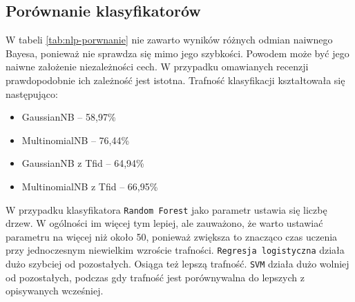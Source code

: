 \documentclass{article}
\begin{document}
\subsection{Porównanie klasyfikatorów}

\begin{table}[]
\centering
\caption{Porównanie trafności klasyfikatorów dla NLP}
\label{tab:nlp-porwnanie}
\end{table}

W tabeli \ref{tab:nlp-porwnanie} nie zawarto wyników różnych odmian naiwnego Bayesa, ponieważ nie sprawdza się mimo jego szybkości. Powodem może być jego naiwne założenie niezależności cech. W przypadku omawianych recenzji prawdopodobnie ich zależność jest istotna. Trafność klasyfikacji kształtowała się następująco:
\begin{itemize}
    \item GaussianNB -- 58,97\%
    \item MultinomialNB -- 76,44\%
    \item GaussianNB z Tfid -- 64,94\%
    \item MultinomialNB z Tfid -- 66,95\%
\end{itemize}

W przypadku klasyfikatora \texttt{Random Forest} jako parametr ustawia się liczbę drzew. W ogólności im więcej tym lepiej, ale zauważono, że warto ustawiać parametru na więcej niż około 50, ponieważ zwiększa to znacząco czas uczenia przy jednoczesnym niewielkim wzroście trafności. \texttt{Regresja logistyczna} działa dużo szybciej od pozostałych. Osiąga też lepszą trafność. \texttt{SVM} działa dużo wolniej od pozostałych, podczas gdy trafność jest porównywalna do lepszych z opisywanych wcześniej.
\end{document}

